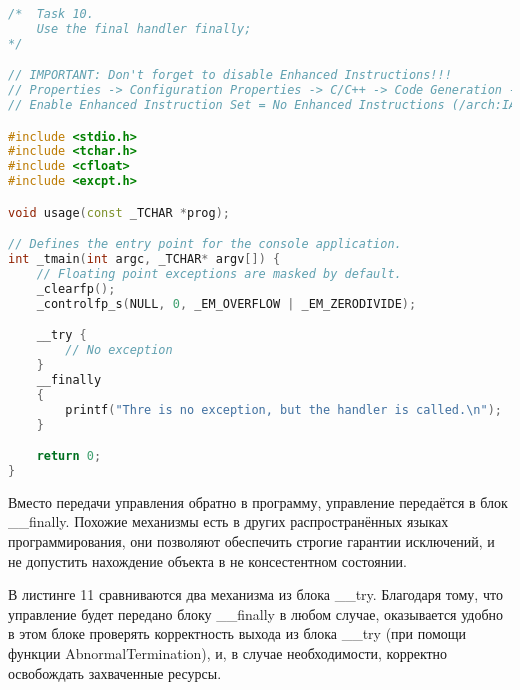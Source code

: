 \documentclass[a4paper,12pt]{article} %
\begin{document}
\begin{lstlisting}[language=C++, caption={Исполнение кода в блоке \_\_finally}]
/*  Task 10.
	Use the final handler finally;
*/

// IMPORTANT: Don't forget to disable Enhanced Instructions!!!
// Properties -> Configuration Properties -> C/C++ -> Code Generation ->
// Enable Enhanced Instruction Set = No Enhanced Instructions (/arch:IA32)

#include <stdio.h>
#include <tchar.h>
#include <cfloat>
#include <excpt.h>

void usage(const _TCHAR *prog);

// Defines the entry point for the console application.
int _tmain(int argc, _TCHAR* argv[]) {
	// Floating point exceptions are masked by default.
	_clearfp();
	_controlfp_s(NULL, 0, _EM_OVERFLOW | _EM_ZERODIVIDE);

	__try {
		// No exception
	}
	__finally
	{
		printf("Thre is no exception, but the handler is called.\n");
	}

	return 0;
}
\end{lstlisting}

Вместо передачи управления обратно в программу, управление передаётся в блок \_\_finally. Похожие механизмы есть в других распространённых языках программирования, они позволяют обеспечить строгие гарантии исключений, и не допустить нахождение объекта в не консестентном состоянии.
\newpage

В листинге 11 сравниваются два механизма из блока \_\_try. Благодаря тому, что управление будет передано блоку \_\_finally в любом случае, оказывается удобно в этом блоке проверять корректность выхода из блока \_\_try (при помощи функции AbnormalTermination), и, в случае необходимости, корректно освобождать захваченные ресурсы.
\end{document}
